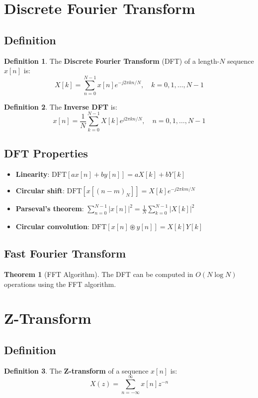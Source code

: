 \documentclass[11pt]{article}
\theoremstyle{definition}
\newtheorem{definition}{Definition}[section]
\newtheorem{theorem}{Theorem}[section]
\begin{document}
\section{Discrete Fourier Transform}

\subsection{Definition}
\begin{definition}
The \textbf{Discrete Fourier Transform} (DFT) of a length-$N$ sequence $x[n]$ is:
$$X[k] = \sum_{n=0}^{N-1} x[n] e^{-j2\pi kn/N}, \quad k = 0, 1, \ldots, N-1$$
\end{definition}

\begin{definition}
The \textbf{Inverse DFT} is:
$$x[n] = \frac{1}{N} \sum_{k=0}^{N-1} X[k] e^{j2\pi kn/N}, \quad n = 0, 1, \ldots, N-1$$
\end{definition}

\subsection{DFT Properties}
\begin{itemize}
    \item \textbf{Linearity}: $\text{DFT}[ax[n] + by[n]] = aX[k] + bY[k]$
    \item \textbf{Circular shift}: $\text{DFT}[x[(n-m)_N]] = X[k]e^{-j2\pi km/N}$
    \item \textbf{Parseval's theorem}: $\sum_{n=0}^{N-1} |x[n]|^2 = \frac{1}{N} \sum_{k=0}^{N-1} |X[k]|^2$
    \item \textbf{Circular convolution}: $\text{DFT}[x[n] \circledast y[n]] = X[k]Y[k]$
\end{itemize}

\subsection{Fast Fourier Transform}
\begin{theorem}[FFT Algorithm]
The DFT can be computed in $O(N \log N)$ operations using the FFT algorithm.
\end{theorem}

\section{Z-Transform}

\subsection{Definition}
\begin{definition}
The \textbf{Z-transform} of a sequence $x[n]$ is:
$$X(z) = \sum_{n=-\infty}^{\infty} x[n] z^{-n}$$
\end{definition}
\end{document}
